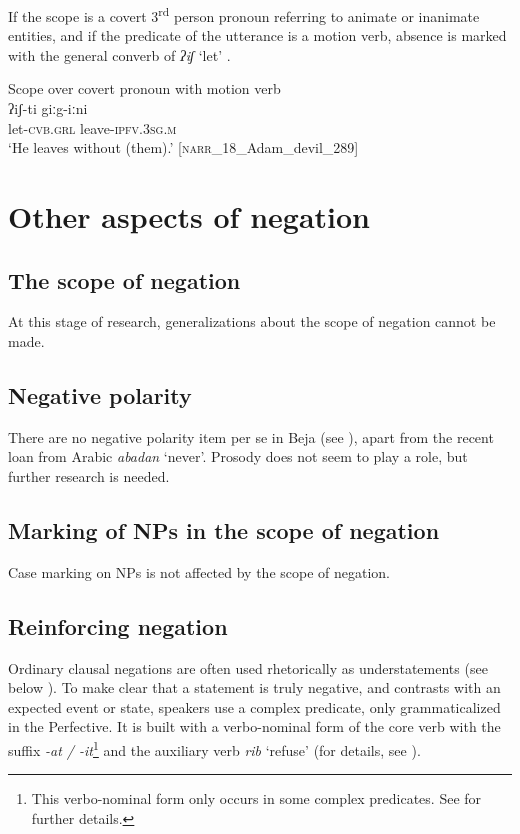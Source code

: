 \documentclass[output=paper,colorlinks,citecolor=brown]{langscibook}
\begin{document}
If the scope is a covert 3\textsuperscript{rd} person pronoun referring to animate or inanimate entities, and if the predicate of the utterance is a motion verb, absence is marked with the general converb of \textit{ʔiʃ} ‘let’ .

\ea\label{ex:beja:40}
{Scope over covert pronoun with motion verb}\\

    \gll ʔiʃ-ti giːg-iːni\\
         let-\textsc{cvb.grl} leave-\textsc{ipfv.3sg.m}\\
    \glt `He leaves without (them).' [\textsc{narr}\_18\_Adam\_devil\_289]
\z

\section{Other aspects of negation}

\subsection{The scope of negation}

At this stage of research, generalizations about the scope of negation cannot be made.

\subsection{Negative polarity}

There are no negative polarity item per se in Beja (see ), apart from the recent loan from Arabic \textit{abadan} ‘never’. Prosody does not seem to play a role, but further research is needed.

\subsection{Marking of NPs in the scope of negation}

Case marking on NPs is not affected by the scope of negation.

\subsection{Reinforcing negation}

Ordinary clausal negations are often used rhetorically as understatements (see below ). To make clear that a statement is truly negative, and contrasts with an expected event or state, speakers use a complex predicate, only grammaticalized in the Perfective. It is built with a verbo-nominal form of the core verb with the suffix \textit{{-at / \nobreakdash-it}}\footnote{This verbo-nominal form only occurs in some complex predicates. See \citet[141 and 148]{Vanhove2017} for further details.} and the auxiliary verb \textit{rib} ‘refuse’  (for details, see \citet{HamidVanhove2002}).
\end{document}
